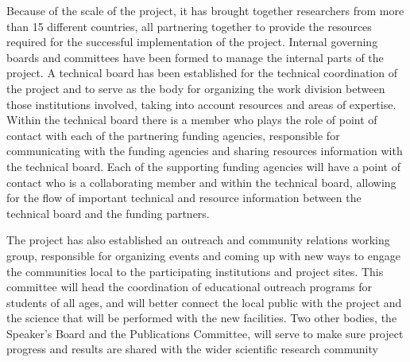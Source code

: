 Because of the scale of the project, it has brought together researchers from more than 15 different countries, all partnering together to provide the resources required for the successful implementation of the project.  Internal governing boards and committees have been formed to manage the internal parts of the project.  A technical board has been established for the technical coordination of the project and to serve as the body for organizing the work division between those institutions involved, taking into account resources and areas of expertise.  Within the technical board there is a member who plays the role of point of contact with each of the partnering funding agencies, responsible for communicating with the funding agencies and sharing resources information with the technical board.  Each of the supporting funding agencies will have a point of contact who is a collaborating member and within the technical board, allowing for the flow of important technical and resource information between the technical board and the funding partners. 

The project has also established an outreach and community relations working group, responsible for organizing events and coming up with new ways to engage the communities local to the participating institutions and project sites.  This committee will head the coordination of educational outreach programs for students of all ages, and will better connect the local public with the project and the science that will be performed with the new facilities.  Two other bodies, the Speaker's Board and the Publications Committee, will serve to make sure project progress and results are shared with the wider scientific research community 





